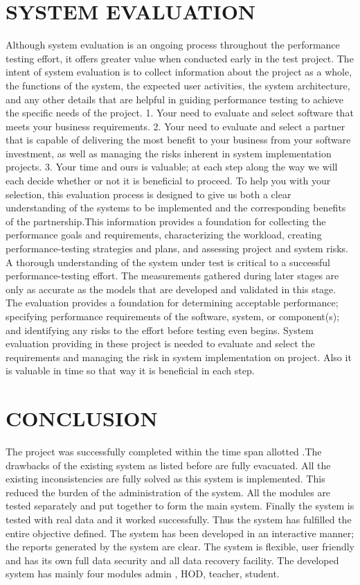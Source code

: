 \documentclass[a4paper,12pt]{article}
\begin{document}
\section{SYSTEM EVALUATION}  
\hspace{5mm}  
Although system evaluation is an ongoing process throughout the performance testing effort, it offers greater value when conducted early in the test project. The intent of system evaluation is to collect information about the project as a whole, the functions of the system, the expected user activities, the system architecture, and any other details that are helpful in guiding performance testing to achieve the specific needs of the project. 
1.	Your need to evaluate and select software that meets your business requirements.
2.	Your need to evaluate and select a partner that is capable of delivering the most benefit to your business from your software investment, as well as managing the risks inherent in system implementation projects.
3.	Your time and ours is valuable; at each step along the way we will each decide whether or not it is beneficial to proceed.
To help you with your selection, this evaluation process is designed to give us both a clear understanding of the systems to be implemented and the corresponding benefits of the partnership.This information provides a foundation for collecting the performance goals and requirements, characterizing the workload, creating performance-testing strategies and plans, and assessing project and system risks. A thorough understanding of the system under test is critical to a successful performance-testing effort. The measurements gathered during later stages are only as accurate as the models that are developed and validated in this stage. The evaluation provides a foundation for determining acceptable performance; specifying performance requirements of the software, system, or component(s); and identifying any risks to the effort before testing even begins. System evaluation providing in these project is needed to evaluate and select the requirements and managing the risk in system implementation on project. Also it is valuable in time so that way it is beneficial in each step.
\newpage
\section{CONCLUSION}  
\hspace{5mm}  
 The project was successfully completed within the time span allotted .The drawbacks of the existing system as listed before are fully evacuated. All the existing inconsistencies are fully solved as this system is implemented. This reduced the burden of the administration of the system. All the modules are tested separately and put together to form the main system. Finally the system is tested with real data and it worked successfully. Thus the system has fulfilled the entire objective defined.
The system has been developed in an interactive manner; the reports generated by the system are clear. The system is flexible, user friendly and has its own full data security and all data recovery facility. The developed system has mainly four modules admin , HOD, teacher, student. 
\newpage
\end{document}
